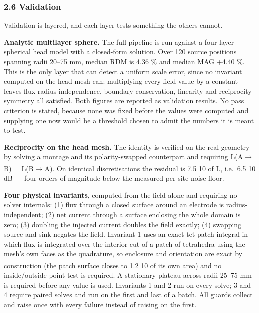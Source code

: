 \documentclass[
  11pt,
  letterpaper,
]{article}
\newcounter{none} %
\begin{document}
\subsubsection{2.6 Validation}\label{validation}

Validation is layered, and each layer tests something the others cannot.

\textbf{Analytic multilayer sphere.} The full pipeline is run against a four-layer
spherical head model with a closed-form solution. Over 120 source positions
spanning radii 20--75 mm, median RDM is 4.36 \% and median MAG +4.40 \%. This is
the only layer that can detect a uniform scale error, since no invariant
computed on the head mesh can: multiplying every field value by a constant
leaves flux radius-independence, boundary conservation, linearity and
reciprocity symmetry all satisfied. Both figures are reported as validation
results. No pass criterion is stated, because none was fixed before the values
were computed and supplying one now would be a threshold chosen to admit the
numbers it is meant to test.

\textbf{Reciprocity on the head mesh.} The identity is verified on the real geometry
by solving a montage and its polarity-swapped counterpart and requiring
L(A$\rightarrow$B) = \textminus{}L(B$\rightarrow$A). On identical discretisations the residual is 7.5 \texttimes{} 10\textsuperscript{} of
\textbar L\textbar, i.e.~6.5 \texttimes{} 10\textsuperscript{} dB --- four orders of magnitude below the measured per-site
noise floor.

\textbf{Four physical invariants}, computed from the field alone and requiring no
solver internals: (1) flux through a closed surface around an electrode is
radius-independent; (2) net current through a surface enclosing the whole domain
is zero; (3) doubling the injected current doubles the field exactly; (4)
swapping source and sink negates the field. Invariant 1 uses an exact tet-patch
integral in which flux is integrated over the interior cut of a patch of
tetrahedra using the mesh's own faces as the quadrature, so enclosure and
orientation are exact by construction (the patch surface closes to 1.2 \texttimes{} 10\textsuperscript{}
of its own area) and no inside/outside point test is required. A stationary
plateau across radii 25--75 mm is required before any value is used. Invariants 1
and 2 run on every solve; 3 and 4 require paired solves and run on the first and
last of a batch. All guards collect and raise once with every failure instead of
raising on the first.
\end{document}
